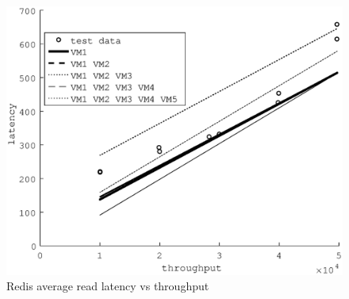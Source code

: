 \documentclass{acm_proc_article-sp}
\begin{document}
\newcommand{\barfigure}[2] {
\begin{figure}
\end{figure}
}

\newcommand{\fitfigure}[2] {
\begin{figure}
\centering
\texttt{[image: \#1]}
\caption{#2}
\label{figure:redisbarread}
\end{figure}
}


\begin{figure}
\centering
\includegraphics[scale = 0.5]{fit_read_avg_latency_r3_x_r3_2x_m3_x_r3__m3_2x_m3_.eps}
\caption{Redis average read latency vs throughput}
\label{figure:redisbarread}
\end{figure}
\end{document}
